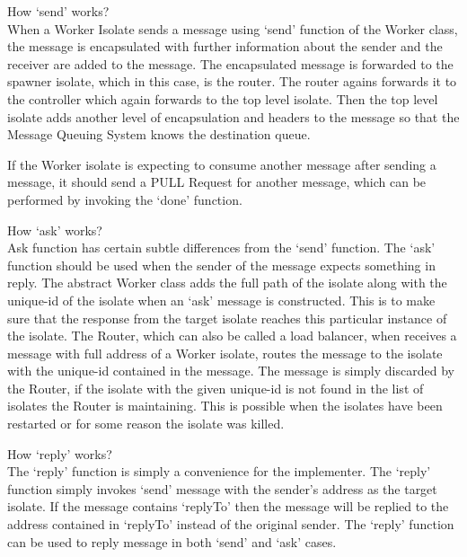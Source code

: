  \begin{description}
    \item How ‘send’ works?\\
      When a Worker Isolate sends a message using ‘send’ function of the Worker class, the message is encapsulated with further information about the sender and the receiver are added to the message. The encapsulated message is forwarded to the spawner isolate, which in this case, is the router. The router agains forwards it to the controller which again forwards to the top level isolate. Then the top level isolate adds another level of encapsulation and headers to the message so that the Message Queuing System knows the destination queue.

      If the Worker isolate is expecting to consume another message after sending a message, it should send a PULL Request for another message, which can be performed by invoking the ‘done’ function.

      \item How ‘ask’ works?\\
    Ask function has certain subtle differences from the ‘send’ function. The ‘ask’ function should be used when the sender of the message expects something in reply. The abstract Worker class adds the full path of the isolate along with the unique-id of the isolate when an ‘ask’ message is constructed. This is to make sure that the response from the target isolate reaches this particular instance of the isolate. The Router, which can also be called a load balancer, when receives a message with full address of a Worker isolate, routes the message to the isolate with the unique-id contained in the message. The message is simply discarded by the Router, if the isolate with the given unique-id is not found in the list of isolates the Router is maintaining. This is possible when the isolates have been restarted or for some reason the isolate was killed.

    \item How ‘reply’ works?\\
    The ‘reply’ function is simply a convenience for the implementer. The ‘reply’ function simply invokes ‘send’ message with the sender’s address as the target isolate. If the message contains ‘replyTo’ then the message will be replied to the address contained in ‘replyTo’ instead of the original sender. The ‘reply’ function can be used to reply message in both \textendash{} ‘send’ and ‘ask’ cases.


\end{description}

